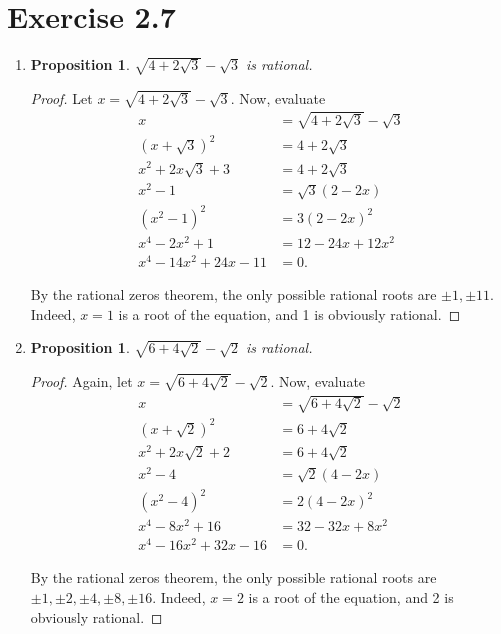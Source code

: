 \documentclass{article}
\newtheorem{proposition}[thm]{Proposition}
\begin{document}
\section*{Exercise 2.7}
\begin{enumerate}[label=(\alph*)]
    \item \begin{proposition}
        $\sqrt{4+2\sqrt{3}} - \sqrt{3}$ is rational.
    \end{proposition}

    \begin{proof}
        Let $x = \sqrt{4+2\sqrt{3}} - \sqrt{3}$. Now, evaluate
        \begin{align*}
            x & = \sqrt{4+2\sqrt{3}} - \sqrt{3} \\
            (x + \sqrt{3})^2 & = 4 + 2\sqrt{3} \\
            x^2 + 2x\sqrt{3} + 3 & = 4 + 2\sqrt{3} \\
            x^2 - 1 & = \sqrt{3}(2-2x) \\
            (x^2 - 1)^2 & = 3(2-2x)^2 \\
            x^4 - 2x^2 + 1 & = 12 - 24x + 12x^2 \\
            x^4 - 14x^2 + 24x - 11 & = 0.
        \end{align*}

        By the rational zeros theorem, the only possible rational roots are $\pm 1, \pm 11$. Indeed, 
        $x = 1$ is a root of the equation, and 1 is obviously rational.
    \end{proof}

    \item \begin{proposition}
        $\sqrt{6 + 4\sqrt{2}} - \sqrt{2}$ is rational.
    \end{proposition}

    \begin{proof}
        Again, let $x = \sqrt{6 + 4\sqrt{2}} - \sqrt{2}$. Now, evaluate
        \begin{align*}
            x & = \sqrt{6 + 4\sqrt{2}} - \sqrt{2} \\
            (x + \sqrt{2})^2 & = 6 + 4\sqrt{2} \\
            x^2 + 2x\sqrt{2} + 2 & = 6 + 4\sqrt{2} \\
            x^2 - 4 & = \sqrt{2}(4-2x) \\
            (x^2 - 4)^2 & = 2(4-2x)^2 \\
            x^4 - 8x^2 + 16 & = 32 - 32x + 8x^2 \\
            x^4 - 16x^2 + 32x - 16 & = 0.
        \end{align*}

        By the rational zeros theorem, the only possible rational roots are $\pm 1, \pm 2, \pm 4,
        \pm 8, \pm 16$. Indeed, $x = 2$ is a root of the equation, and 2 is obviously rational.
    \end{proof}
\end{enumerate}
\bigbreak
\end{document}
